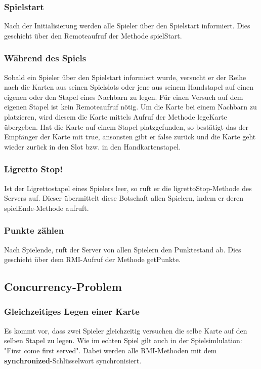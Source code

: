 \subsubsection{Spielstart}
Nach der Initialisierung werden alle Spieler über den Spielstart informiert. Dies geschieht über den Remoteaufruf der Methode spielStart.

\subsubsection{Während des Spiels}
Sobald ein Spieler über den Spielstart informiert wurde, versucht er der Reihe nach die Karten aus seinen Spielslots oder jene aus seinem Handstapel auf einen eigenen oder den Stapel eines Nachbarn zu legen. Für einen Versuch auf dem eigenen Stapel ist kein Remoteaufruf nötig. Um die Karte bei einem Nachbarn zu platzieren, wird diesem die Karte mittels Aufruf der Methode legeKarte übergeben. Hat die Karte auf einem Stapel platzgefunden, so bestätigt das der Empfänger der Karte mit true, ansonsten gibt er false zurück und die Karte geht wieder zurück in den Slot bzw. in den Handkartenstapel.

\subsubsection{Ligretto Stop!}
Ist der Ligrettostapel eines Spielers leer, so ruft er die ligrettoStop-Methode des Servers auf. Dieser übermittelt diese Botschaft allen Spielern, indem er deren spielEnde-Methode aufruft.

\subsubsection{Punkte zählen}
Nach Spielende, ruft der Server von allen Spielern den Punktestand ab. Dies geschieht über dem RMI-Aufruf der Methode getPunkte.


\subsection{Concurrency-Problem}

\subsubsection{Gleichzeitiges Legen einer Karte}
Es kommt vor, dass zwei Spieler gleichzeitig versuchen die selbe Karte auf den selben Stapel zu legen. Wie im echten Spiel gilt auch in der Spielsimlulation: "First come first served". Dabei werden alle RMI-Methoden mit dem \textbf{synchronized}-Schlüsselwort synchronisiert.

